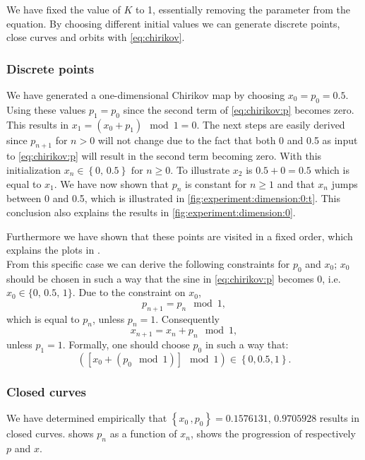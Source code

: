 We have fixed the value of $K$ to 1, essentially removing the parameter from the equation. By choosing different initial values we can generate discrete points, close curves and orbits with \cref{eq:chirikov}.

\subsubsection{Discrete points}
We have generated a one-dimensional Chirikov map by choosing $x_0 = p_0 = 0.5$. Using these values $p_1 = p_0$ since the second term of \eqref{eq:chirikov:p} becomes zero. This results in $x_1 = \left( x_0 + p_{1} \right) \mod 1= 0$. The next steps are easily derived since $p_{n + 1}$ for $n > 0$ will not change due to the fact that both 0 and 0.5 as input to \eqref{eq:chirikov:p} will result in the second term becoming zero. With this initialization $x_{n} \in \left\{0,\, 0.5 \right\} \text{ for } n \geq 0$. To illustrate $x_2$ is $0.5 + 0 = 0.5$ which is equal to $x_1$. We have now shown that $p_n$ is constant for $n \geq 1$ and that $x_n$ jumps between 0 and 0.5, which is illustrated in \cref{fig:experiment:dimension:0:t}. This conclusion also explains the results in \cref{fig:experiment:dimension:0}. 

Furthermore we have shown that these points are visited in a fixed order, which explains the plots in .\\

From this specific case we can derive the following constraints for $p_0$ and $x_0$; $x_0$ should be chosen in such a way that the sine in \cref{eq:chirikov:p} becomes 0, i.e. $x_0 \in \{0,\, 0.5,\, 1\}$. Due to the constraint on $x_0$,
\begin{equation*}
p_{n + 1} = p_{n} \mod 1,
\end{equation*}
	which is equal to $p_n$, unless $p_n = 1$. Consequently
	\begin{equation*}
	x_{n + 1} = x_n + p_n \mod 1,
	\end{equation*}
unless $p_1 = 1$. Formally, one should choose $p_0$ in such a way that:
\begin{equation*}
	\left( \left[ x_0 + (p_0 \mod 1)\right] \mod 1 \right) \in \left\{0, 0.5, 1\right\}.
\end{equation*}

\subsubsection{Closed curves}
We have determined empirically that $\left\{x_0\,, p_0 \right\} = {\num{0.1576131},\,\num{0.9705928}}$ results in closed curves.  shows $p_n$ as a function of $x_n$,  shows the progression of respectively $p$ and $x$.\\

